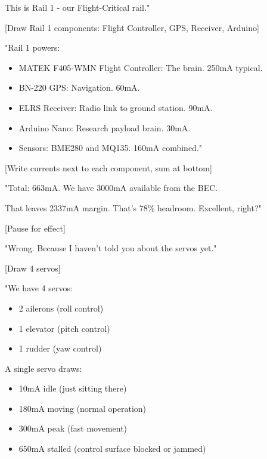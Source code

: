 \documentclass[11pt,letterpaper]{article}
\begin{document}
{This is Rail 1 - our Flight-Critical rail."\par

[Draw Rail 1 components: Flight Controller, GPS, Receiver, Arduino]\par

"Rail 1 powers:\par

\begin{itemize}
  \item MATEK F405-WMN Flight Controller: The brain. 250mA typical.
  \item BN-220 GPS: Navigation. 60mA.
  \item ELRS Receiver: Radio link to ground station. 90mA.
  \item Arduino Nano: Research payload brain. 30mA.
  \item Sensors: BME280 and MQ135. 160mA combined."
\end{itemize}

[Write currents next to each component, sum at bottom]\par

"Total: 663mA. We have 3000mA available from the BEC.\par

That leaves 2337mA margin. That's 78\% headroom. Excellent, right?"\par

[Pause for effect]\par

"Wrong. Because I haven't told you about the servos yet."\par

[Draw 4 servos]\par

"We have 4 servos:\par

\begin{itemize}
  \item 2 ailerons (roll control)
  \item 1 elevator (pitch control)
  \item 1 rudder (yaw control)
\end{itemize}

A single servo draws:\par

\begin{itemize}
  \item 10mA idle (just sitting there)
  \item 180mA moving (normal operation)
  \item 300mA peak (fast movement)
  \item 650mA stalled (control surface blocked or jammed)
\end{itemize}

}
\end{document}
